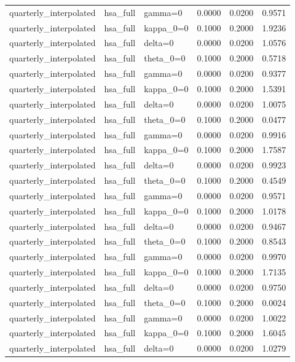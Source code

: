 \begin{tabular}{lllrrr}
quarterly\_interpolated & hsa\_full & gamma=0 & 0.0000 & 0.0200 & 0.9571 \\
quarterly\_interpolated & hsa\_full & kappa\_0=0 & 0.1000 & 0.2000 & 1.9236 \\
quarterly\_interpolated & hsa\_full & delta=0 & 0.0000 & 0.0200 & 1.0576 \\
quarterly\_interpolated & hsa\_full & theta\_0=0 & 0.1000 & 0.2000 & 0.5718 \\
quarterly\_interpolated & hsa\_full & gamma=0 & 0.0000 & 0.0200 & 0.9377 \\
quarterly\_interpolated & hsa\_full & kappa\_0=0 & 0.1000 & 0.2000 & 1.5391 \\
quarterly\_interpolated & hsa\_full & delta=0 & 0.0000 & 0.0200 & 1.0075 \\
quarterly\_interpolated & hsa\_full & theta\_0=0 & 0.1000 & 0.2000 & 0.0477 \\
quarterly\_interpolated & hsa\_full & gamma=0 & 0.0000 & 0.0200 & 0.9916 \\
quarterly\_interpolated & hsa\_full & kappa\_0=0 & 0.1000 & 0.2000 & 1.7587 \\
quarterly\_interpolated & hsa\_full & delta=0 & 0.0000 & 0.0200 & 0.9923 \\
quarterly\_interpolated & hsa\_full & theta\_0=0 & 0.1000 & 0.2000 & 0.4549 \\
quarterly\_interpolated & hsa\_full & gamma=0 & 0.0000 & 0.0200 & 0.9571 \\
quarterly\_interpolated & hsa\_full & kappa\_0=0 & 0.1000 & 0.2000 & 1.0178 \\
quarterly\_interpolated & hsa\_full & delta=0 & 0.0000 & 0.0200 & 0.9467 \\
quarterly\_interpolated & hsa\_full & theta\_0=0 & 0.1000 & 0.2000 & 0.8543 \\
quarterly\_interpolated & hsa\_full & gamma=0 & 0.0000 & 0.0200 & 0.9970 \\
quarterly\_interpolated & hsa\_full & kappa\_0=0 & 0.1000 & 0.2000 & 1.7135 \\
quarterly\_interpolated & hsa\_full & delta=0 & 0.0000 & 0.0200 & 0.9750 \\
quarterly\_interpolated & hsa\_full & theta\_0=0 & 0.1000 & 0.2000 & 0.0024 \\
quarterly\_interpolated & hsa\_full & gamma=0 & 0.0000 & 0.0200 & 1.0022 \\
quarterly\_interpolated & hsa\_full & kappa\_0=0 & 0.1000 & 0.2000 & 1.6045 \\
quarterly\_interpolated & hsa\_full & delta=0 & 0.0000 & 0.0200 & 1.0279 \\

\end{tabular}

